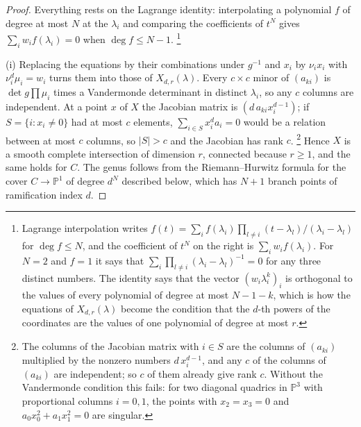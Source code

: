 \documentclass[11pt,reqno]{amsart}
\theoremstyle{plain}
\theoremstyle{definition}
\theoremstyle{remark}
\newcommand{\PP}{\mathbb{P}}
\begin{document}
\begin{proof}
Everything rests on the Lagrange identity: interpolating a polynomial $f$
of degree at most $N$ at the $\lambda_{i}$ and comparing the coefficients of
$t^{N}$ gives $\sum_{i}w_{i}f(\lambda_{i})=0$ when $\deg f\le N-1$.%
\footnote{Lagrange interpolation writes
$f(t)=\sum_{i}f(\lambda_{i})\prod_{l\ne i}(t-\lambda_{l})/(\lambda_{i}-\lambda_{l})$
for $\deg f\le N$, and the coefficient of $t^{N}$ on the right is
$\sum_{i}w_{i}f(\lambda_{i})$. For $N=2$ and $f=1$ it says that
$\sum_{i}\prod_{l\ne i}(\lambda_{i}-\lambda_{l})^{-1}=0$ for any three
distinct numbers. The
identity says that the vector $(w_{i}\lambda_{i}^{k})_{i}$ is orthogonal to the
values of every polynomial of degree at most $N-1-k$, which is how the
equations of $X_{d,r}(\lambda)$ become the condition that the $d$-th powers of
the coordinates are the values of one polynomial of degree at most $r$.}

(i) Replacing the equations by their combinations under $g^{-1}$ and $x_{i}$
by $\nu_{i}x_{i}$ with $\nu_{i}^{d}\mu_{i}=w_{i}$ turns them into those of
$X_{d,r}(\lambda)$. Every $c\times c$ minor of $(a_{ki})$ is
$\det g\prod\mu_{i}$ times a Vandermonde determinant in distinct
$\lambda_{i}$, so any $c$ columns are independent. At a point $x$ of $X$ the
Jacobian matrix is $(d\,a_{ki}x_{i}^{d-1})$; if $S=\{i:x_{i}\ne0\}$ had at most
$c$ elements, $\sum_{i\in S}x_{i}^{d}a_{i}=0$ would be a relation between at
most $c$ columns, so $|S|>c$ and the Jacobian has rank $c$.%
\footnote{The columns of the Jacobian matrix with $i\in S$ are the columns of
$(a_{ki})$ multiplied by the nonzero numbers $d\,x_{i}^{d-1}$, and any $c$ of
the columns of $(a_{ki})$ are independent; so $c$ of them already give rank
$c$. Without the Vandermonde condition this fails: for two diagonal
quadrics in $\PP^{3}$ with proportional columns $i=0,1$, the points with
$x_{2}=x_{3}=0$ and $a_{0}x_{0}^{2}+a_{1}x_{1}^{2}=0$ are singular.} Hence $X$ is a
smooth complete intersection of dimension $r$, connected because $r\ge1$, and
the same holds for $C$. The genus follows from the Riemann--Hurwitz formula
for the cover $C\to\PP^{1}$ of degree $d^{N}$ described below, which has
$N+1$ branch points of ramification index $d$.


\end{proof}
\end{document}

